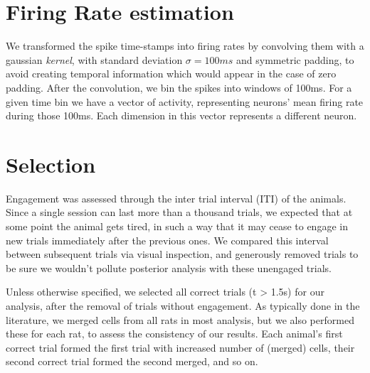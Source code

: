 \section{Firing Rate estimation}
    We transformed the spike time-stamps into firing rates by convolving them with a gaussian \textit{kernel}, with standard deviation $\sigma = 100ms$ and symmetric padding, to avoid creating temporal information which would appear in the case of zero padding. After the convolution, we bin the spikes into windows of 100ms. For a given time bin we have a vector of activity, representing neurons' mean firing rate during those 100ms. Each dimension in this vector represents a different neuron.
    

\section{Selection}
    Engagement was assessed through the inter trial interval (ITI) of the animals. Since a single session can last more than a thousand trials, we expected that at some point the animal gets tired, in such a way that it may cease to engage in new trials immediately after the previous ones. We compared this interval between subsequent trials via visual inspection, and generously removed trials to be sure we wouldn't pollute posterior analysis with these unengaged trials.
    
    Unless otherwise specified, we selected all correct trials (t > 1.5s) for our analysis, after the removal of trials without engagement. 
    As typically done in the literature, we merged cells from all rats in most analysis, but we also performed these for each rat, to assess the consistency of our results. Each animal's first correct trial formed the first trial with increased number of (merged) cells, their second correct trial formed the second merged, and so on.

